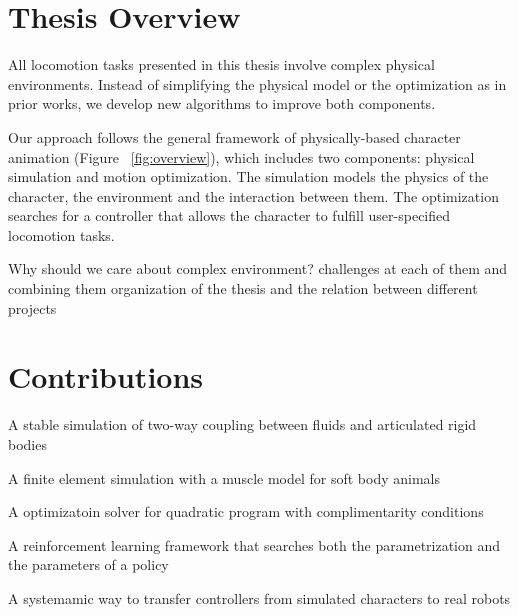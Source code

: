 \section{Thesis Overview}

All locomotion tasks presented in this thesis involve complex physical environments. Instead of simplifying the physical model or the optimization as in prior works, we develop new algorithms to improve both components.

Our approach follows the general framework of physically-based character animation (Figure ~\ref{fig:overview}), which includes two components: physical simulation and motion optimization. The simulation models the physics of the character, the environment and the interaction between them. The optimization searches for a controller that allows the character to fulfill user-specified locomotion tasks. 


Why should we care about complex environment?
challenges at each of them and combining them
organization of the thesis and the relation between different projects


\section{Contributions}

A stable simulation of two-way coupling between fluids and articulated rigid bodies

A finite element simulation with a muscle model for soft body animals

A optimizatoin solver for quadratic program with complimentarity conditions

A reinforcement learning framework that searches both the parametrization and the parameters of a policy

A systemamic way to transfer controllers from simulated characters to real robots

